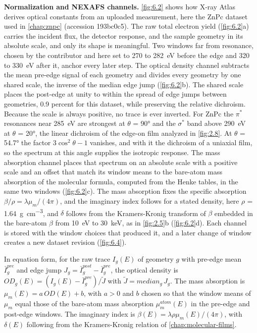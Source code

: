 \textbf{Normalization and NEXAFS channels.} \cref{fig:6.2} shows how X-ray Atlas derives optical constants from an uploaded measurement, here the ZnPc dataset used in \cref{chap:znpc} (accession 193bc0c5). The raw total electron yield (\cref{fig:6.2}a) carries the incident flux, the detector response, and the sample geometry in its absolute scale, and only its shape is meaningful. Two windows far from resonance, chosen by the contributor and here set to 270 to \qty{282}{eV} before the edge and 320 to \qty{330}{eV} after it, anchor every later step.\autocite{wattsMethodsCarbonKedge2006} The optical density channel subtracts the mean pre-edge signal of each geometry and divides every geometry by one shared scale, the inverse of the median edge jump (\cref{fig:6.2}b). The shared scale places the post-edge at unity to within the spread of edge jumps between geometries, 0.9 percent for this dataset, while preserving the relative dichroism. Because the scale is always positive, no trace is ever inverted. For ZnPc the \(\pi^{*}\) resonances near \qty{285}{eV} are strongest at \(\theta\) = \ang{90} and the \(\sigma^{*}\) band above \qty{290}{eV} at \(\theta\) = \ang{20}, the linear dichroism of the edge-on film analyzed in \cref{fig:2.8}. At \(\theta\) = \ang{54.7} the factor \(3\cos^{2}\theta - 1\) vanishes, and with it the dichroism of a uniaxial film\autocite{stohrNEXAFSSpectroscopy1992}, so the spectrum at this angle supplies the isotropic response. The mass absorption channel places that spectrum on an absolute scale with a positive scale and an offset that match its window means to the bare-atom mass absorption of the molecular formula, computed from the Henke tables\autocite{henkeXRayInteractionsPhotoabsorption1993}, in the same two windows (\cref{fig:6.2}c). The mass absorption fixes the specific absorption \(\beta/\rho = \lambda\mu_{m}/(4\pi)\), and the imaginary index follows for a stated density, here \(\rho\) = \qty{1.64}{g.cm^{-3}}, and \(\delta\) follows from the Kramers-Kronig transform of \(\beta\) embedded in the bare-atom \(\beta\) from \qty{10}{eV} to \qty{30}{keV},\autocite{wattsCalculationKramersKronigTransform2014} as in \cref{fig:2.5}b (\cref{fig:6.2}d). Each channel is stored with the window choices that produced it, and a later change of window creates a new dataset revision (\cref{fig:6.4}).

In equation form, for the raw trace \(I_{g}(E)\) of geometry \(g\) with pre-edge mean \({\bar{I}}_{g}^{pre}\) and edge jump \(J_{g} = {\bar{I}}_{g}^{post} - {\bar{I}}_{g}^{pre}\), the optical density is \({OD}_{g}(E) = \left( I_{g}(E) - {\bar{I}}_{g}^{pre} \right)/\widetilde{J}\) with \(\widetilde{J} = {median}_{g}\, J_{g}\). The mass absorption is \(\mu_{m}(E) = a\, OD(E) + b\), with \(a > 0\) and \(b\) chosen so that the window means of \(\mu_{m}\) equal those of the bare-atom mass absorption \(\mu_{m}^{atom}(E)\) in the pre-edge and post-edge windows. The imaginary index is \(\beta(E) = \lambda\rho\mu_{m}(E)/(4\pi)\), with \(\delta(E)\) following from the Kramers-Kronig relation of \cref{chap:molecular-films}.


